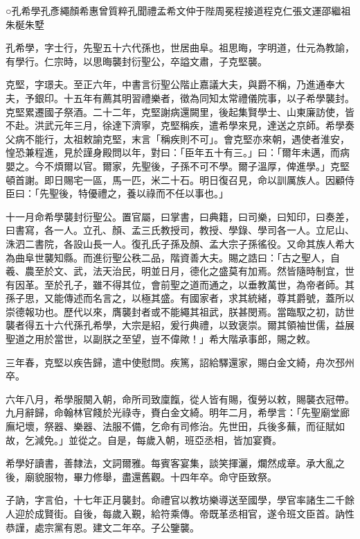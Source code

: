 
\begin{pinyinscope}
○孔希學孔彥繩顏希惠曾質粹孔聞禮孟希文仲于陛周冕程接道程克仁張文運邵繼祖朱梴朱墅

孔希學，字士行，先聖五十六代孫也，世居曲阜。祖思晦，字明道，仕元為教諭，有學行。仁宗時，以思晦襲封衍聖公，卒謚文肅，子克堅襲。

克堅，字璟夫。至正六年，中書言衍聖公階止嘉議大夫，與爵不稱，乃進通奉大夫，予銀印。十五年有薦其明習禮樂者，徵為同知太常禮儀院事，以子希學襲封。克堅累遷國子祭酒。二十二年，克堅謝病還闕里，後起集賢學士、山東廉訪使，皆不赴。洪武元年三月，徐達下濟寧，克堅稱疾，遣希學來見，達送之京師。希學奏父病不能行，太祖敕諭克堅，末言「稱疾則不可」。會克堅亦來朝，遇使者淮安，惶恐兼程進，見於謹身殿問以年，對曰：「臣年五十有三。」曰：「爾年未邁，而病嬰之。今不煩爾以官。爾家，先聖後，子孫不可不學。爾子溫厚，俾進學。」克堅頓首謝。即日賜宅一區，馬一匹，米二十石。明日復召見，命以訓厲族人。因顧侍臣曰：「先聖後，特優禮之，養以祿而不任以事也。」

十一月命希學襲封衍聖公。置官屬，曰掌書，曰典籍，曰司樂，曰知印，曰奏差，曰書寫，各一人。立孔、顏、孟三氏教授司，教授、學錄、學司各一人。立尼山、洙泗二書院，各設山長一人。復孔氏子孫及顏、孟大宗子孫徭役。又命其族人希大為曲阜世襲知縣。而進衍聖公秩二品，階資善大夫。賜之誥曰：「古之聖人，自羲、農至於文、武，法天治民，明並日月，德化之盛莫有加焉。然皆隨時制宜，世有因革。至於孔子，雖不得其位，會前聖之道而通之，以垂教萬世，為帝者師。其孫子思，又能傳述而名言之，以極其盛。有國家者，求其統緒，尊其爵號，蓋所以崇德報功也。歷代以來，膺襲封者或不能繩其祖武，朕甚閔焉。當臨馭之初，訪世襲者得五十六代孫孔希學，大宗是紹，爰行典禮，以致褒崇。爾其領袖世儒，益展聖道之用於當世，以副朕之至望，豈不偉歟！」希大階承事郎，賜之敕。

三年春，克堅以疾告歸，遣中使慰問。疾篤，詔給驛還家，賜白金文綺，舟次邳州卒。

六年八月，希學服闋入朝，命所司致廩餼，從人皆有賜，復勞以敕，賜襲衣冠帶。九月辭歸，命翰林官餞於光祿寺，賚白金文綺。明年二月，希學言：「先聖廟堂廊廡圮壞，祭器、樂器、法服不備，乞命有司修治。先世田，兵後多蕪，而征賦如故，乞減免。」並從之。自是，每歲入朝，班亞丞相，皆加宴賚。

希學好讀書，善隸法，文詞爾雅。每賓客宴集，談笑揮灑，爛然成章。承大亂之後，廟貌服物，畢力修舉，盡還舊觀。十四年卒。命守臣致祭。

子訥，字言伯，十七年正月襲封。命禮官以教坊樂導送至國學，學官率諸生二千餘人迎於成賢街。自後，每歲入覲，給符乘傳。帝既革丞相官，遂令班文臣首。訥性恭謹，處宗黨有恩。建文二年卒。子公鑒襲。


\end{pinyinscope}
